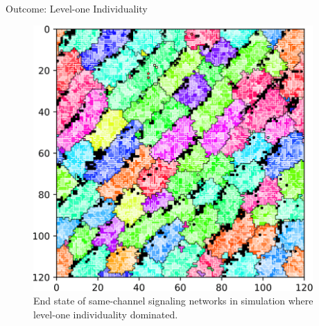 \begin{frame}{Outcome: Level-one Individuality}
\begin{figure}
\begin{columns}
\begin{column}{0.6\textwidth}
\includegraphics[width=\textwidth]{img/results/ChannelMap_1041_update19500000.png}
\end{column}
\begin{column}{0.4\textwidth}
\caption{
End state of same-channel signaling networks in simulation where level-one individuality dominated.
}
\end{column}
\end{columns}
\end{figure}
\end{frame}

